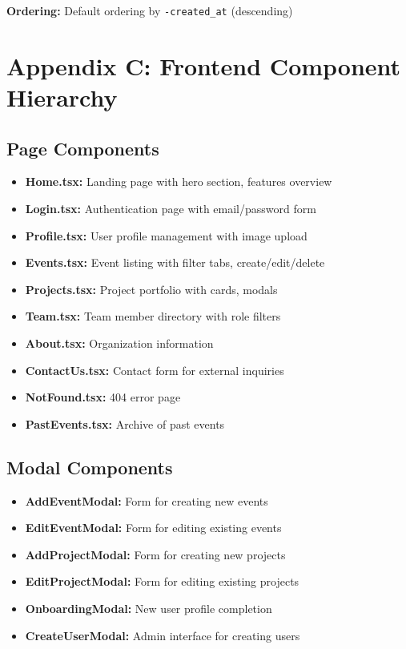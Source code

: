 \documentclass[11pt,a4paper]{article}
\begin{document}
\textbf{Ordering:} Default ordering by \texttt{-created\_at} (descending)

\section{Appendix C: Frontend Component Hierarchy}

\subsection{Page Components}
\begin{itemize}[leftmargin=*]
    \item \textbf{Home.tsx:} Landing page with hero section, features overview
    \item \textbf{Login.tsx:} Authentication page with email/password form
    \item \textbf{Profile.tsx:} User profile management with image upload
    \item \textbf{Events.tsx:} Event listing with filter tabs, create/edit/delete
    \item \textbf{Projects.tsx:} Project portfolio with cards, modals
    \item \textbf{Team.tsx:} Team member directory with role filters
    \item \textbf{About.tsx:} Organization information
    \item \textbf{ContactUs.tsx:} Contact form for external inquiries
    \item \textbf{NotFound.tsx:} 404 error page
    \item \textbf{PastEvents.tsx:} Archive of past events
\end{itemize}

\subsection{Modal Components}
\begin{itemize}[leftmargin=*]
    \item \textbf{AddEventModal:} Form for creating new events
    \item \textbf{EditEventModal:} Form for editing existing events
    \item \textbf{AddProjectModal:} Form for creating new projects
    \item \textbf{EditProjectModal:} Form for editing existing projects
    \item \textbf{OnboardingModal:} New user profile completion
    \item \textbf{CreateUserModal:} Admin interface for creating users
\end{itemize}
\end{document}

